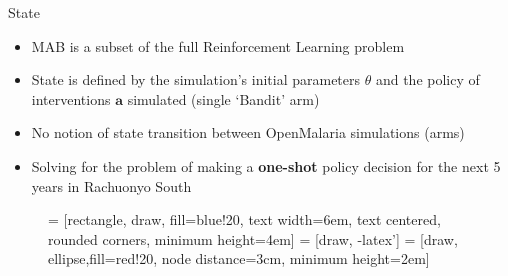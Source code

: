\documentclass[10pt,usenames,dvipsnames]{beamer}
\begin{document}
\begin{frame}{State}

\begin{itemize}
\item MAB is a subset of the full Reinforcement Learning problem
\item State is defined by the simulation's initial parameters $\theta$ and the policy of interventions $\bm{a}$ simulated (single `Bandit' arm)
\item No notion of state transition between OpenMalaria simulations (arms)
\item Solving for the problem of making a \textbf{one-shot} policy decision for the next 5 years in Rachuonyo South

\end{itemize}

\begin{figure}[!t]
\centering
{} = [rectangle, draw, fill=blue!20, 
    text width=6em, text centered, rounded corners, minimum height=4em]
 = [draw, -latex']
 = [draw, ellipse,fill=red!20, node distance=3cm,
    minimum height=2em]
    
\label{fig_flow}
\end{figure}



\end{frame}
\end{document}
